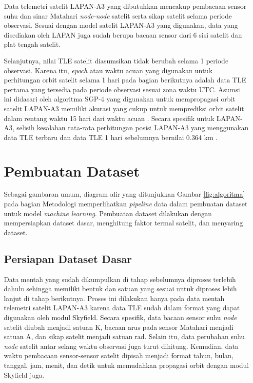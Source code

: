 Data telemetri satelit LAPAN-A3 yang dibutuhkan mencakup pembacaan sensor suhu
dan sinar Matahari \textit{node-node} satelit serta sikap satelit selama
periode observasi. Sesuai dengan model satelit LAPAN-A3 yang digunakan, data
yang disediakan oleh LAPAN juga sudah berupa bacaan sensor dari 6 sisi satelit
dan plat tengah satelit.

Selanjutnya, nilai TLE satelit diasumsikan tidak berubah selama 1 periode
observasi. Karena itu, \textit{epoch} atau waktu acuan yang digunakan untuk
perhitungan orbit satelit selama 1 hari pada bagian berikutnya adalah data TLE
pertama yang tersedia pada periode observasi sesuai zona waktu UTC. Asumsi ini
didasari oleh algoritma SGP-4 yang digunakan untuk mempropagasi orbit satelit
LAPAN-A3 memiliki akurasi yang cukup untuk memprediksi orbit satelit dalam
rentang waktu 15 hari dari waktu acuan \cite{kelsoa}. Secara spesifik untuk
LAPAN-A3, selisih kesalahan rata-rata perhitungan posisi LAPAN-A3 yang
menggunakan data TLE terbaru dan data TLE 1 hari sebelumnya bernilai 0.364 km
\cite{nugroho2018}. 

\section{Pembuatan Dataset}

Sebagai gambaran umum, diagram alir yang ditunjukkan Gambar \ref{fig:algoritma}
pada bagian Metodologi memperlihatkan \textit{pipeline} data dalam pembuatan
dataset untuk model \textit{machine learning}. Pembuatan dataset dilakukan
dengan mempersiapkan dataset dasar, menghitung faktor termal satelit, dan
menyaring dataset.

\subsection{Persiapan Dataset Dasar}

Data mentah yang sudah dikumpulkan di tahap sebelumnya diproses terlebih dahulu
sehingga memiliki bentuk dan satuan yang sesuai untuk diproses lebih lanjut di
tahap berikutnya. Proses ini dilakukan hanya pada data mentah telemetri satelit
LAPAN-A3 karena data TLE sudah dalam format yang dapat digunakan oleh modul
Skyfield. Secara spesifik, data bacaan sensor suhu \textit{node} satelit diubah
menjadi satuan K, bacaan arus pada sensor Matahari menjadi satuan A, dan sikap
satelit menjadi satuan rad. Selain itu, data perubahan suhu \textit{node}
satelit antar selang waktu observasi juga turut dihitung. Kemudian, data waktu
pembacaan sensor-sensor satelit dipisah menjadi format tahun, bulan, tanggal,
jam, menit, dan detik untuk memudahkan propagasi orbit dengan modul Skyfield
juga.


